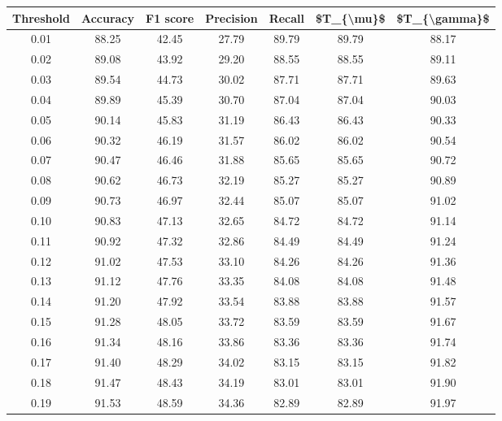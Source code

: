 \begin{tabular}{|c|c|c|c|c|c|c|}
\hline
 Threshold &  Accuracy &  F1 score &  Precision &  Recall &  \$T\_\{\textbackslash mu\}\$ &  \$T\_\{\textbackslash gamma\}\$ \\
\hline
      0.01 &     88.25 &     42.45 &      27.79 &   89.79 &      89.79 &         88.17 \\
      0.02 &     89.08 &     43.92 &      29.20 &   88.55 &      88.55 &         89.11 \\
      0.03 &     89.54 &     44.73 &      30.02 &   87.71 &      87.71 &         89.63 \\
      0.04 &     89.89 &     45.39 &      30.70 &   87.04 &      87.04 &         90.03 \\
      0.05 &     90.14 &     45.83 &      31.19 &   86.43 &      86.43 &         90.33 \\
      0.06 &     90.32 &     46.19 &      31.57 &   86.02 &      86.02 &         90.54 \\
      0.07 &     90.47 &     46.46 &      31.88 &   85.65 &      85.65 &         90.72 \\
      0.08 &     90.62 &     46.73 &      32.19 &   85.27 &      85.27 &         90.89 \\
      0.09 &     90.73 &     46.97 &      32.44 &   85.07 &      85.07 &         91.02 \\
      0.10 &     90.83 &     47.13 &      32.65 &   84.72 &      84.72 &         91.14 \\
      0.11 &     90.92 &     47.32 &      32.86 &   84.49 &      84.49 &         91.24 \\
      0.12 &     91.02 &     47.53 &      33.10 &   84.26 &      84.26 &         91.36 \\
      0.13 &     91.12 &     47.76 &      33.35 &   84.08 &      84.08 &         91.48 \\
      0.14 &     91.20 &     47.92 &      33.54 &   83.88 &      83.88 &         91.57 \\
      0.15 &     91.28 &     48.05 &      33.72 &   83.59 &      83.59 &         91.67 \\
      0.16 &     91.34 &     48.16 &      33.86 &   83.36 &      83.36 &         91.74 \\
      0.17 &     91.40 &     48.29 &      34.02 &   83.15 &      83.15 &         91.82 \\
      0.18 &     91.47 &     48.43 &      34.19 &   83.01 &      83.01 &         91.90 \\
      0.19 &     91.53 &     48.59 &      34.36 &   82.89 &      82.89 &         91.97 \\

\end{tabular}
